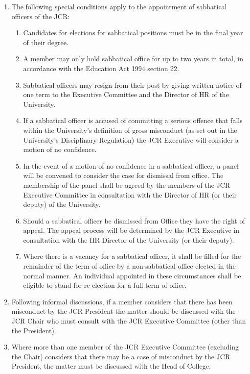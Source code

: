 \documentclass[12pt]{article}  %
\begin{document}
\begin{enumerate}
\begin{enumerate}
    \end{enumerate}
    \item The following special conditions apply to the appointment of sabbatical officers of the JCR:
    \begin{enumerate}
        \item Candidates for elections for sabbatical positions must be in the final year of their degree.
        \item A member may only hold sabbatical office for up to two years in total, in accordance with the Education Act 1994 section 22.
        \item Sabbatical officers may resign from their post by giving written notice of one term to the Executive Committee and the Director of HR of the University.
        \item If a sabbatical officer is accused of committing a serious offence that falls within the University’s definition of gross misconduct (as set out in the University’s Disciplinary Regulation) the JCR Executive will consider a motion of no confidence.
        \item In the event of a motion of no confidence in a sabbatical officer, a panel will be convened to consider the case for dismissal from office. The membership of the panel shall be agreed by the members of the JCR Executive Committee in consultation with the Director of HR (or their deputy) of the University.
        \item Should a sabbatical officer be dismissed from Office they have the right of appeal. The appeal process will be determined by the JCR Executive in consultation with the HR Director of the University (or their deputy).
        \item Where there is a vacancy for a sabbatical officer, it shall be filled for the remainder of the term of office by a non-sabbatical office elected in the normal manner. An individual appointed in these circumstances shall be eligible to stand for re-election for a full term of office.
    \end{enumerate}
    \item Following informal discussions, if a member considers that there has been misconduct by the JCR President the matter should be discussed with the JCR Chair who must consult with the JCR Executive Committee (other than the President).
    \item Where more than one member of the JCR Executive Committee (excluding the Chair) considers that there may be a case of misconduct by the JCR President, the matter must be discussed with the Head of College.

\end{enumerate}
\end{document}
